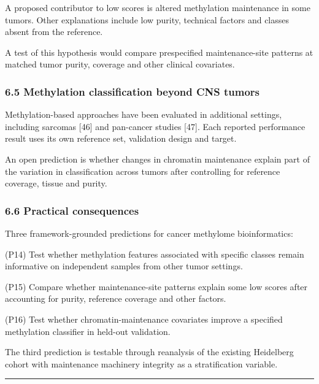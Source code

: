 \documentclass[
]{article}
\begin{document}
A proposed contributor to low scores is altered methylation maintenance
in some tumors. Other explanations include low purity, technical factors
and classes absent from the reference.

A test of this hypothesis would compare prespecified maintenance-site
patterns at matched tumor purity, coverage and other clinical
covariates.

\hypertarget{methylation-classification-beyond-cns-tumors}{%
\subsubsection{6.5 Methylation classification beyond CNS
tumors}\label{methylation-classification-beyond-cns-tumors}}

Methylation-based approaches have been evaluated in additional settings,
including sarcomas {[}46{]} and pan-cancer studies {[}47{]}. Each
reported performance result uses its own reference set, validation
design and target.

An open prediction is whether changes in chromatin maintenance explain
part of the variation in classification across tumors after controlling
for reference coverage, tissue and purity.

\hypertarget{practical-consequences-4}{%
\subsubsection{6.6 Practical
consequences}\label{practical-consequences-4}}

Three framework-grounded predictions for cancer methylome
bioinformatics:

(P14) Test whether methylation features associated with specific classes
remain informative on independent samples from other tumor settings.

(P15) Compare whether maintenance-site patterns explain some low scores
after accounting for purity, reference coverage and other factors.

(P16) Test whether chromatin-maintenance covariates improve a specified
methylation classifier in held-out validation.

The third prediction is testable through reanalysis of the existing
Heidelberg cohort with maintenance machinery integrity as a
stratification variable.

\begin{center}\rule{0.5\linewidth}{0.5pt}\end{center}
\end{document}
